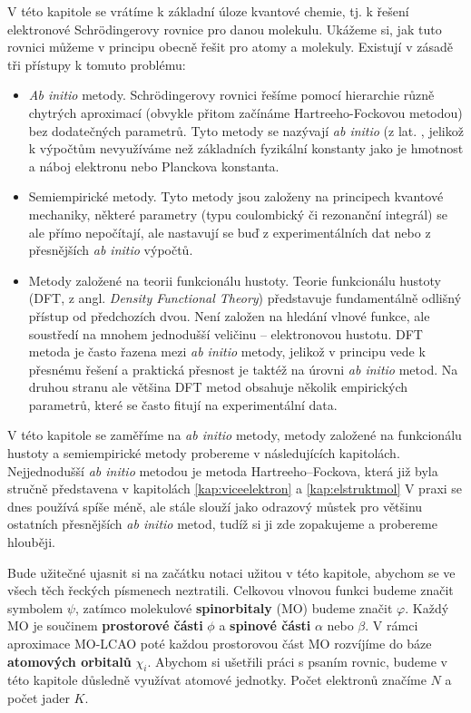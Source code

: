 V této kapitole se vrátíme k základní úloze kvantové chemie, tj. k řešení elektronové Schr\"{o}dingerovy rovnice pro danou molekulu. Ukážeme si, jak tuto rovnici můžeme v principu obecně řešit pro atomy a molekuly.  Existují v zásadě tři přístupy k tomuto problému:

\begin{itemize}

\item \textit{Ab initio} metody.  Schr\"{o}dingerovy  rovnici řešíme pomocí hierarchie různě chytrých aproximací (obvykle přitom začínáme Hartreeho-Fockovou metodou) bez dodatečných parametrů. Tyto metody se nazývají \textit{ab initio} (z lat. , jelikož k výpočtům nevyužíváme než základních fyzikální konstanty jako je hmotnost a náboj elektronu nebo Planckova konstanta. 

\item Semiempirické metody. Tyto metody jsou založeny na principech kvantové mechaniky, některé parametry (typu coulombický či rezonanční integrál) se ale přímo nepočítají, ale nastavují se buď z experimentálních dat nebo z přesnějších \textit{ab initio} výpočtů.

\item Metody založené na teorii funkcionálu hustoty.  Teorie funkcionálu hustoty (DFT, z angl. \textit{Density Functional Theory}) představuje fundamentálně odlišný přístup od předchozích dvou. Není založen na hledání vlnové funkce, ale soustředí na mnohem jednodušší veličinu -- elektronovou hustotu. DFT metoda je často řazena mezi \textit{ab initio} metody, jelikož v principu vede k přesnému řešení a praktická přesnost je taktéž na úrovni \textit{ab initio} metod. Na druhou stranu ale většina DFT metod obsahuje několik empirických parametrů, které se často fitují na experimentální data.    

\end{itemize}

V této kapitole se zaměříme na \textit{ab initio} metody, metody založené na funkcionálu hustoty a semiempirické metody probereme v následujících kapitolách. Nejjednodušší \textit{ab initio} metodou je metoda Hartreeho--Fockova, která již byla stručně představena v kapitolách \ref{kap:viceelektron} a \ref{kap:elstruktmol}
V praxi se dnes používá spíše méně, ale stále slouží jako odrazový můstek pro většinu ostatních přesnějších \textit{ab initio} metod, tudíž si ji zde zopakujeme a probereme hlouběji.

Bude užitečné ujasnit si na začátku notaci užitou v této kapitole, abychom se ve všech těch řeckých písmenech neztratili. Celkovou vlnovou funkci budeme značit symbolem $\psi$,  zatímco molekulové \textbf{spinorbitaly} (MO) budeme značit $\varphi$. Každý MO je součinem \textbf{prostorové části} $\phi$ a \textbf{spinové části} $\alpha$ nebo $\beta$. V rámci aproximace MO-LCAO poté každou prostorovou část MO rozvíjíme do báze \textbf{atomových orbitalů} $\chi_i$. Abychom si ušetřili práci s psaním rovnic, budeme v této kapitole důsledně využívat atomové jednotky. Počet elektronů značíme $N$ a počet jader $K$.

